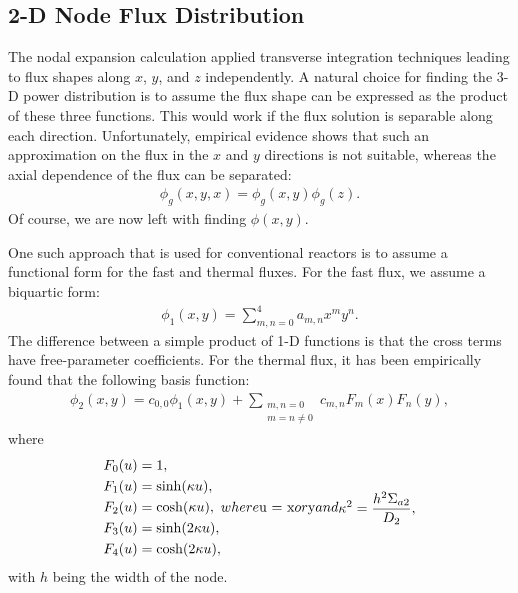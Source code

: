 \subsection{2-D Node Flux Distribution}

The nodal expansion calculation applied transverse integration techniques leading to flux shapes along $x$, $y$, and $z$ independently. A natural choice for finding the 3-D power distribution is to assume the flux shape can be expressed as the product of these three functions. This would work if the flux solution is separable along each direction. Unfortunately, empirical evidence shows that such an approximation on the flux in the $x$ and $y$ directions is not suitable, whereas the axial dependence of the flux can be separated:
\begin{align}
  \phi_g(x,y,x) = \phi_g(x,y) \phi_g(z) .
\end{align}
Of course, we are now left with finding $\phi(x,y)$.

One such approach that is used for conventional reactors is to assume a functional form for the fast and thermal fluxes. For the fast flux, we assume a biquartic form:
\begin{align}
  \phi_1(x,y) = \sum_{m,n=0}^4 a_{m,n} x^m y^n .
\end{align}
The difference between a simple product of 1-D functions is that the cross terms have free-parameter coefficients. For the thermal flux, it has been empirically found that the following basis function:
\begin{align}
  \phi_2(x,y) = c_{0,0} \phi_1(x,y) + \sum_{\substack{m,n = 0\\ m = n \ne 0}} c_{m,n} F_m(x) F_n(y) ,
\end{align}
where
\begin{subequations}
\begin{align}
  F_0(u) &= 1, \\
  F_1(u) &= \sinh(  \kappa u ), \\
  F_2(u) &= \cosh(  \kappa u ), \\
  F_3(u) &= \sinh( 2\kappa u ), \\
  F_4(u) &= \cosh( 2\kappa u ),
\end{align}
where $u = x$ or $y$ and
\begin{align}
  \kappa^2 = \frac{ h^2 \Sigma_{a2} }{ D_2 } ,
\end{align}
\end{subequations}
with $h$ being the width of the node.

